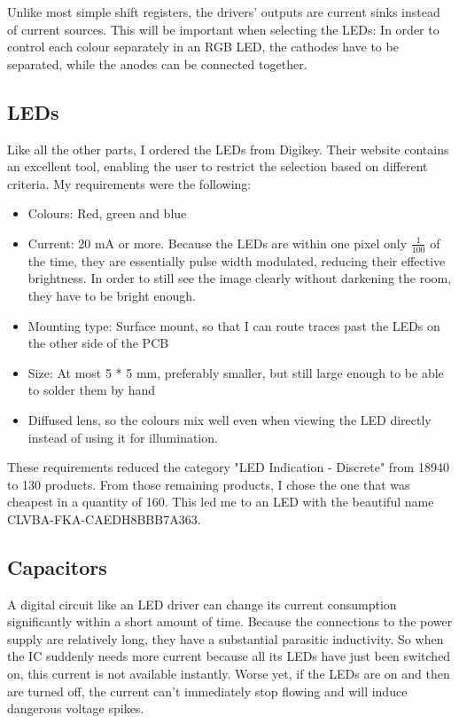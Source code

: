 \documentclass[a4paper, 11pt, titlepage]{report}
\begin{document}
Unlike most simple shift registers, the drivers' outputs are current sinks instead of current
sources. This will be important when selecting the LEDs: In order to control each colour separately
in an RGB LED, the cathodes have to be separated, while the anodes can be connected together.



\subsection{LEDs}

Like all the other parts, I ordered the LEDs from Digikey. Their website
contains an excellent tool, enabling the user to restrict the selection based on different criteria.
My requirements were the following:

\begin{itemize}

	\item Colours: Red, green and blue
	\item Current: 20 mA or more. Because the LEDs are within one pixel only $\frac{1}{100}$ of the
time, they are essentially pulse width modulated, reducing their effective brightness. In order to
still see the image clearly without darkening the room, they have to be bright enough.
	\item Mounting type: Surface mount, so that I can route traces past the LEDs on the other side
of the PCB
	\item Size: At most 5 * 5 mm, preferably smaller, but still large enough to be able to solder them
by hand
	\item Diffused lens, so the colours mix well even when viewing the LED directly instead of using
it for illumination.

\end{itemize}

These requirements reduced the category "LED Indication - Discrete" from 18940 to 130 products.
From those remaining products, I chose the one that was cheapest in a quantity of 160. This
led me to an LED with the beautiful name CLVBA-FKA-CAEDH8BBB7A363.



\subsection{Capacitors}

A digital circuit like an LED driver can change its current consumption significantly within a
short amount of time. Because the connections to the power supply are relatively long, they have
a substantial parasitic inductivity. So when the IC suddenly needs more current because all its
LEDs have just been switched on, this current is not available instantly. Worse yet, if the LEDs
are on and then are turned off, the current can't immediately stop flowing and will induce
dangerous voltage spikes.
\end{document}
